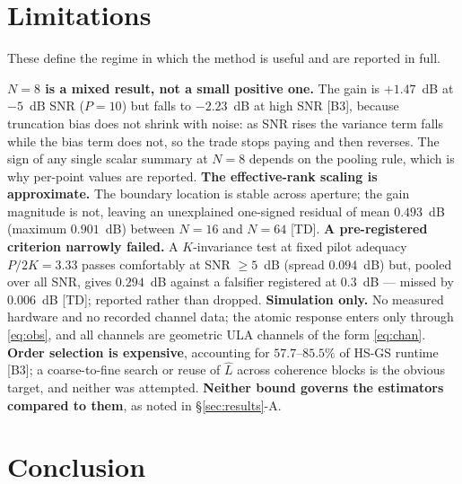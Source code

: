\documentclass[conference]{IEEEtran}
\begin{document}
\section{Limitations}\label{sec:limits}

These define the regime in which the method is useful and are reported in full.

\textbf{$N=8$ is a mixed result, not a small positive one.} The gain is
$+1.47$~dB at $-5$~dB SNR ($P=10$) but falls to $-2.23$~dB at high SNR [B3],
because truncation bias does not shrink with noise: as SNR rises the variance
term falls while the bias term does not, so the trade stops paying and then
reverses. The sign of any single scalar summary at $N=8$ depends on the pooling
rule, which is why per-point values are reported.
\textbf{The effective-rank scaling is approximate.} The boundary location is
stable across aperture; the gain magnitude is not, leaving an unexplained
one-signed residual of mean $0.493$~dB (maximum $0.901$~dB) between $N=16$ and
$N=64$ [TD]. \textbf{A pre-registered criterion narrowly failed.} A
$K$-invariance test at fixed pilot adequacy $P/2K=3.33$ passes comfortably at
SNR $\ge5$~dB (spread $0.094$~dB) but, pooled over all SNR, gives $0.294$~dB
against a falsifier registered at $0.3$~dB --- missed by $0.006$~dB [TD];
reported rather than dropped. \textbf{Simulation only.} No measured hardware
and no recorded channel data; the atomic response enters only through
\eqref{eq:obs}, and all channels are geometric ULA channels of the form
\eqref{eq:chan}. \textbf{Order selection is expensive}, accounting for
$57.7$--$85.5\%$ of HS-GS runtime [B3]; a coarse-to-fine search or reuse of
$\hat L$ across coherence blocks is the obvious target, and neither was
attempted. \textbf{Neither bound governs the estimators compared to them}, as
noted in \S\ref{sec:results}-A.

\section{Conclusion}
\end{document}
